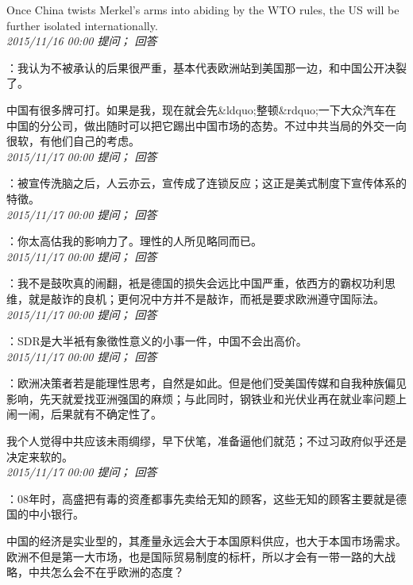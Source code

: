 \documentclass[twocolumn]{ctexart}
\begin{document}
Once China twists Merkel's arms into abiding by the WTO rules, the US will be further isolated internationally.\\

\textit{\hfill\noindent\small 2015/11/16 00:00 提问； 回答}

：我认为不被承认的后果很严重，基本代表欧洲站到美国那一边，和中国公开决裂了。

中国有很多牌可打。如果是我，现在就会先\&ldquo;整顿\&rdquo;一下大众汽车在中国的分公司，做出随时可以把它踢出中国市场的态势。不过中共当局的外交一向很软，有他们自己的考虑。\\

\textit{\hfill\noindent\small 2015/11/17 00:00 提问； 回答}

：被宣传洗脑之后，人云亦云，宣传成了连锁反应；这正是美式制度下宣传体系的特徵。\\

\textit{\hfill\noindent\small 2015/11/17 00:00 提问； 回答}

：你太高估我的影响力了。理性的人所见略同而已。\\

\textit{\hfill\noindent\small 2015/11/17 00:00 提问； 回答}

：我不是鼓吹真的闹翻，衹是德国的损失会远比中国严重，依西方的霸权功利思维，就是敲诈的良机；更何况中方并不是敲诈，而衹是要求欧洲遵守国际法。\\

\textit{\hfill\noindent\small 2015/11/17 00:00 提问； 回答}

：SDR是大半衹有象徵性意义的小事一件，中国不会出高价。\\

\textit{\hfill\noindent\small 2015/11/17 00:00 提问； 回答}

：欧洲决策者若是能理性思考，自然是如此。但是他们受美国传媒和自我种族偏见影响，先天就爱找亚洲强国的麻烦；与此同时，钢铁业和光伏业再在就业率问题上闹一闹，后果就有不确定性了。

我个人觉得中共应该未雨绸缪，早下伏笔，准备逼他们就范；不过习政府似乎还是决定来软的。\\

\textit{\hfill\noindent\small 2015/11/17 00:00 提问； 回答}

：08年时，高盛把有毒的资產都事先卖给无知的顾客，这些无知的顾客主要就是德国的中小银行。

中国的经济是实业型的，其產量永远会大于本国原料供应，也大于本国市场需求。欧洲不但是第一大市场，也是国际贸易制度的标杆，所以才会有一带一路的大战略，中共怎么会不在乎欧洲的态度？\\
\end{document}
